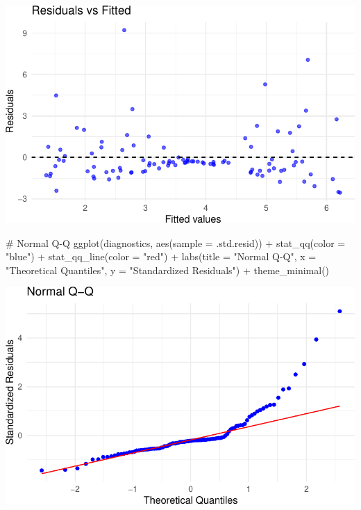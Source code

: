 \documentclass[
  11pt,
]{article}
\newenvironment{Shaded}{\begin{snugshade}}{\end{snugshade}}
\newcommand{\AttributeTok}[1]{\textcolor[rgb]{0.40,0.45,0.13}{#1}}
\newcommand{\CommentTok}[1]{\textcolor[rgb]{0.37,0.37,0.37}{#1}}
\newcommand{\FunctionTok}[1]{\textcolor[rgb]{0.28,0.35,0.67}{#1}}
\newcommand{\NormalTok}[1]{\textcolor[rgb]{0.00,0.23,0.31}{#1}}
\newcommand{\SpecialCharTok}[1]{\textcolor[rgb]{0.37,0.37,0.37}{#1}}
\newcommand{\StringTok}[1]{\textcolor[rgb]{0.13,0.47,0.30}{#1}}
\begin{document}
\includegraphics{HW-4-CODE-and-ANSWERS_files/figure-pdf/unnamed-chunk-1-1.pdf}

\begin{Shaded}
\begin{Highlighting}[]
\CommentTok{\# Normal Q{-}Q}
\FunctionTok{ggplot}\NormalTok{(diagnostics, }\FunctionTok{aes}\NormalTok{(}\AttributeTok{sample =}\NormalTok{ .std.resid)) }\SpecialCharTok{+}
  \FunctionTok{stat\_qq}\NormalTok{(}\AttributeTok{color =} \StringTok{"blue"}\NormalTok{) }\SpecialCharTok{+}
  \FunctionTok{stat\_qq\_line}\NormalTok{(}\AttributeTok{color =} \StringTok{"red"}\NormalTok{) }\SpecialCharTok{+}
  \FunctionTok{labs}\NormalTok{(}\AttributeTok{title =} \StringTok{"Normal Q{-}Q"}\NormalTok{, }\AttributeTok{x =} \StringTok{"Theoretical Quantiles"}\NormalTok{, }
       \AttributeTok{y =} \StringTok{"Standardized Residuals"}\NormalTok{) }\SpecialCharTok{+}
  \FunctionTok{theme\_minimal}\NormalTok{()}
\end{Highlighting}
\end{Shaded}

\includegraphics{HW-4-CODE-and-ANSWERS_files/figure-pdf/unnamed-chunk-2-1.pdf}
\end{document}

